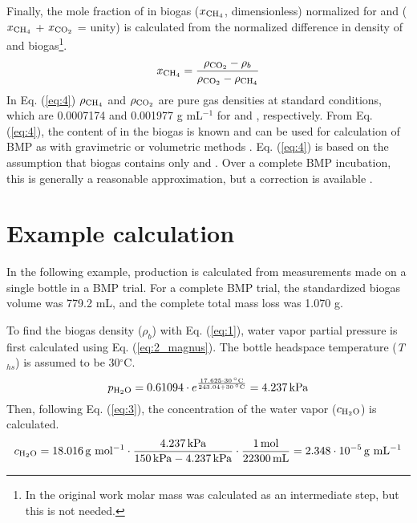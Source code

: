\documentclass[]{article}
\newcommand{\unit}[1]{\ensuremath{\, \mathrm{#1}}}
\begin{document}
Finally, the mole fraction of  in biogas ($x\textsubscript{CH$_4$}$, dimensionless) normalized for  and  ($x\textsubscript{CH$_4$}$ + $x\textsubscript{CO$_2$}$ = unity) is calculated from the normalized difference in density of  and biogas\footnote{
  In the original work \citep{justesenDevelopmentValidationLowcost2019} molar mass was calculated as an intermediate step, but this is not needed.
}.
\begin{equation}
  \label{eq:4}
  x\textsubscript{CH$_4$}=\frac{\rho\textsubscript{CO$_2$} - \rho_b}{\rho\textsubscript{CO$_2$}-\rho\textsubscript{CH$_4$}}
\end{equation}
In Eq. (\ref{eq:4}) $\rho\textsubscript{CH$_4$}$ and $\rho\textsubscript{CO$_2$}$ are pure gas densities at standard conditions, which are 0.0007174 and 0.001977 g mL$^{-1}$ for  and , respectively.
From Eq. (\ref{eq:4}), the content of  in the biogas is known and can be used for calculation of BMP as with gravimetric or volumetric methods \citep{hafnerValidationSimpleGravimetric2015}. 
Eq. (\ref{eq:4}) is based on the assumption that biogas contains only  and .
Over a complete BMP incubation, this is generally a reasonable approximation, but a correction is available \citep{justesenDevelopmentValidationLowcost2019}.

\section{Example calculation} \label{s_example}
In the following example,  production is calculated from measurements made on a single bottle in a BMP trial.
For a complete BMP trial, the standardized biogas volume \citep{BMPdoc201vol} was 779.2 mL, and the complete total mass loss was 1.070 g.

To find the biogas density ($\rho_b$) with Eq. (\ref{eq:1}), water vapor partial pressure is first calculated using Eq. (\ref{eq:2_magnus}). 
The bottle headspace temperature (\textit{T}$_{hs}$) is assumed to be 30$^\circ$C.
\begin{equation*}
  p\textsubscript{H$_2$O} = 0.61094 \cdot e^{\frac{17.625 \cdot 30\unit{^\circ C}}{243.04 + 30 \unit{^\circ C}}} = 4.237 \unit{kPa}
\end{equation*}
Then, following Eq. (\ref{eq:3}), the concentration of the water vapor ($c\textsubscript{H$_2$O}$) is calculated.
\begin{equation*}
  c\textsubscript{H$_2$O} = 18.016 \unit{g~mol^{-1}} \cdot \frac{4.237 \unit{kPa}}{150 \unit{kPa} - 4.237 \unit{kPa}} \cdot \frac{1 \unit{mol}}{22300 \unit{mL}} = 2.348\cdot10^{-5} \unit{g~mL^{-1}}
\end{equation*}
\end{document}
